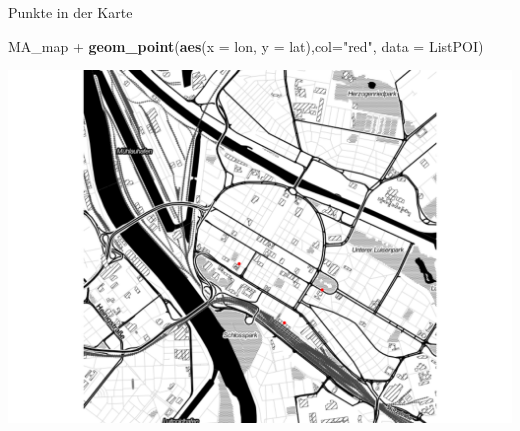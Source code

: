 \documentclass[ignorenonframetext,]{beamer}
\newenvironment{Shaded}{}{}
\newcommand{\KeywordTok}[1]{\textcolor[rgb]{0.00,0.44,0.13}{\textbf{{#1}}}}
\newcommand{\DataTypeTok}[1]{\textcolor[rgb]{0.56,0.13,0.00}{{#1}}}
\newcommand{\StringTok}[1]{\textcolor[rgb]{0.25,0.44,0.63}{{#1}}}
\newcommand{\NormalTok}[1]{{#1}}
\begin{document}
\begin{frame}[fragile]{Punkte in der Karte}

\begin{Shaded}
\begin{Highlighting}[]
\NormalTok{MA_map +}
\KeywordTok{geom_point}\NormalTok{(}\KeywordTok{aes}\NormalTok{(}\DataTypeTok{x =} \NormalTok{lon, }\DataTypeTok{y =} \NormalTok{lat),}\DataTypeTok{col=}\StringTok{"red"}\NormalTok{,}
\DataTypeTok{data =} \NormalTok{ListPOI)}
\end{Highlighting}
\end{Shaded}

\includegraphics{R_intern_files/figure-beamer/unnamed-chunk-286-1.pdf}

\end{frame}
\end{document}
